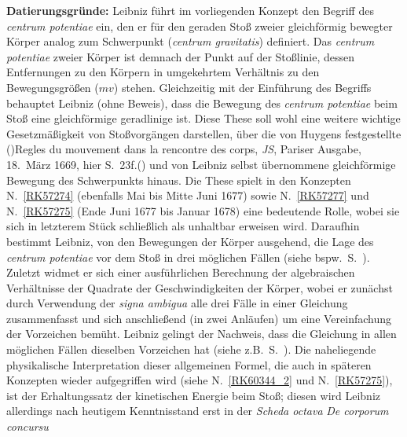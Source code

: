 \begin{ledgroup}
\footnotesize
\pstart
\noindent%
\textbf{Datierungsgründe:}
%
Leibniz führt im vorliegenden Konzept
%
den Begriff des \textit{centrum potentiae} ein,
%
den er für den geraden Stoß zweier gleichförmig bewegter Körper
%
analog zum Schwerpunkt (\textit{centrum gravitatis}) definiert.
%
Das \textit{centrum potentiae} zweier Körper ist demnach
%
der Punkt auf der Stoßlinie, dessen Entfernungen zu den Körpern in umgekehrtem Verhältnis
%
zu den Bewegungsgrößen ($mv$) stehen. 
%
Gleichzeitig mit der Einführung des Begriffs behauptet Leibniz (ohne Beweis),
%
dass die Bewegung des \textit{centrum potentiae} beim Stoß eine  gleichförmige geradlinige ist.
%
Diese These soll wohl eine weitere wichtige Gesetzmäßigkeit von Stoßvorgängen darstellen,
%
über die von \protect{}Huygens 
%
festgestellte 
%
(\protect\vphantom)\cite{00529}\glqq Regles du mouvement dans la rencontre des corps\grqq, \cite{00157}\textit{JS}, Pariser Ausgabe, 18.~März 1669, hier S.~23f.\protect\vphantom()
%
und von Leibniz selbst übernommene gleichförmige Bewegung des Schwerpunkts hinaus.
%
Die These spielt in den Konzepten N.~\ref{RK57274} 
%
(ebenfalls Mai bis Mitte Juni 1677) 
sowie N.~\ref{RK57277} und N.~\ref{RK57275} (Ende Juni 1677 bis Januar 1678)
eine bedeutende Rolle, wobei sie sich in letzterem Stück schließlich als unhaltbar erweisen wird.
%
%
Daraufhin bestimmt Leibniz, von den Bewegungen der Körper ausgehend,
%
die Lage des \textit{centrum potentiae} vor dem Stoß in drei möglichen Fällen 
%
(siehe bspw.\ S.~).
%
Zuletzt widmet er sich einer ausführlichen Berechnung der algebraischen Verhältnisse der Quadrate der Geschwindigkeiten der Körper,
%
wobei er zunächst durch Verwendung der \textit{signa ambigua} alle drei Fälle in einer Gleichung zusammenfasst
%
und sich anschließend (in zwei Anläufen) um eine Vereinfachung der Vorzeichen bemüht.
%
Leibniz gelingt der Nachweis, dass die Gleichung in allen möglichen Fällen dieselben Vorzeichen hat
%
(siehe z.B.\ S.~).
%
Die naheliegende physikalische Interpretation dieser allgemeinen Formel,
%
die auch in späteren Konzepten wieder aufgegriffen wird 
%
(siehe N.~\ref{RK60344_2}  und N.~\ref{RK57275}),
%
ist der Erhaltungssatz der kinetischen Energie beim Stoß;
%
diesen wird Leibniz allerdings nach heutigem Kenntnisstand 
%
erst in der \textit{Scheda octava} \textit{De corporum concursu} 

\end{ledgroup}
